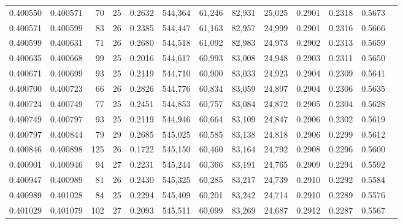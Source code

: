 \begin{tabular}{rrrrrrrrrrrrr}
0.400550 & 0.400571 &    70 &  25 &                                     0.2632 & 544,364 &  61,246 &  82,931 &  25,025 & 0.2901 & 0.2318 & 0.5673 \\
0.400571 & 0.400599 &    83 &  26 &                                     0.2385 & 544,447 &  61,163 &  82,957 &  24,999 & 0.2901 & 0.2316 & 0.5666 \\
0.400599 & 0.400631 &    71 &  26 &                                     0.2680 & 544,518 &  61,092 &  82,983 &  24,973 & 0.2902 & 0.2313 & 0.5659 \\
0.400635 & 0.400668 &    99 &  25 &                                     0.2016 & 544,617 &  60,993 &  83,008 &  24,948 & 0.2903 & 0.2311 & 0.5650 \\
0.400671 & 0.400699 &    93 &  25 &                                     0.2119 & 544,710 &  60,900 &  83,033 &  24,923 & 0.2904 & 0.2309 & 0.5641 \\
0.400700 & 0.400723 &    66 &  26 &                                     0.2826 & 544,776 &  60,834 &  83,059 &  24,897 & 0.2904 & 0.2306 & 0.5635 \\
0.400724 & 0.400749 &    77 &  25 &                                     0.2451 & 544,853 &  60,757 &  83,084 &  24,872 & 0.2905 & 0.2304 & 0.5628 \\
0.400749 & 0.400797 &    93 &  25 &                                     0.2119 & 544,946 &  60,664 &  83,109 &  24,847 & 0.2906 & 0.2302 & 0.5619 \\
0.400797 & 0.400844 &    79 &  29 &                                     0.2685 & 545,025 &  60,585 &  83,138 &  24,818 & 0.2906 & 0.2299 & 0.5612 \\
0.400846 & 0.400898 &   125 &  26 &                                     0.1722 & 545,150 &  60,460 &  83,164 &  24,792 & 0.2908 & 0.2296 & 0.5600 \\
0.400901 & 0.400946 &    94 &  27 &                                     0.2231 & 545,244 &  60,366 &  83,191 &  24,765 & 0.2909 & 0.2294 & 0.5592 \\
0.400947 & 0.400989 &    81 &  26 &                                     0.2430 & 545,325 &  60,285 &  83,217 &  24,739 & 0.2910 & 0.2292 & 0.5584 \\
0.400989 & 0.401028 &    84 &  25 &                                     0.2294 & 545,409 &  60,201 &  83,242 &  24,714 & 0.2910 & 0.2289 & 0.5576 \\
0.401029 & 0.401079 &   102 &  27 &                                     0.2093 & 545,511 &  60,099 &  83,269 &  24,687 & 0.2912 & 0.2287 & 0.5567 \\

\end{tabular}
